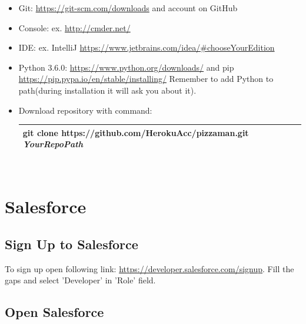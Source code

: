\documentclass[12pt,a4paper]{article}
\begin{document}
\begin{itemize}
\item Git: \url{https://git-scm.com/downloads} and account on GitHub
\item Console: ex. \url{http://cmder.net/}
\item IDE: ex. IntelliJ \url{https://www.jetbrains.com/idea/#chooseYourEdition}
\item Python 3.6.0: \url{https://www.python.org/downloads/} and pip \url{https://pip.pypa.io/en/stable/installing/} Remember to add Python to path(during installation it will ask you about it).
\item Download repository with command:\\
\begin{tabular}{|l|}
	\hline
 git clone https://github.com/HerokuAcc/pizzaman.git \textit{YourRepoPath}\\
	\hline
\end{tabular}\\


\end{itemize}

\section{Salesforce}
\subsection{Sign Up to Salesforce}
To sign up open following link: \url{https://developer.salesforce.com/signup}.
Fill the gaps and select 'Developer' in 'Role' field.

\subsection{Open Salesforce}
\end{document}
